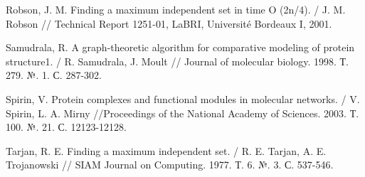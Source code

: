 \begin{thebibliography}{9}
 Robson, J. M. Finding a maximum independent set in time O (2n/4). / J. M. Robson // Technical Report 1251-01, LaBRI, Université Bordeaux I, 2001.

 Samudrala, R. A graph-theoretic algorithm for comparative modeling of protein structure1. / R. Samudrala, J. Moult // Journal of molecular biology. 1998. Т. 279. №. 1. С. 287-302.

 Spirin, V. Protein complexes and functional modules in molecular networks. / V. Spirin, L. A. Mirny //Proceedings of the National Academy of Sciences. 2003. Т. 100. №. 21. С. 12123-12128.

 Tarjan, R. E. Finding a maximum independent set. / R. E. Tarjan, A. E. Trojanowski // SIAM Journal on Computing. 1977. Т. 6. №. 3. С. 537-546.

\end{thebibliography}
